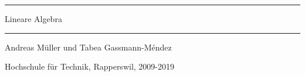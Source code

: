 \documentclass[a4paper,12pt]{book}
\begin{document}
\pagestyle{fancy}
\frontmatter
\newcommand\HRule{\noindent\rule{\linewidth}{1.5pt}}
\begin{titlepage}
\HRule
\vspace*{10pt}
\begin{flushright}
{\Huge
Lineare Algebra}
\end{flushright}
\HRule
\begin{flushright}
\vspace{30pt}
\LARGE
Andreas Müller
und
Tabea Gassmann-Méndez
\end{flushright}
\begin{center}
Hochschule für Technik, Rapperswil, 2009-2019
\end{center}
\end{titlepage}
\hypersetup{
    linktoc=all,
    linkcolor=blue
}
\tableofcontents
\newtheorem{satz}{Satz}[chapter]
\newtheorem{hilfssatz}[satz]{Hilfssatz}
\newtheorem{definition}[satz]{Definition}
\newtheorem{konvention}[satz]{Konvention}
\newtheorem{annahme}[satz]{Annahme}
\newtheorem{aufgabe}[satz]{Aufgabe}
\newenvironment{beispiel}[1][Beispiel]{%
\begin{proof}[\bf #1]%
\renewcommand{\qedsymbol}{$\bigcirc$}%
}{\end{proof}}
\mainmatter









%
%
%
%
%
%
%
%
%
%
%
%
%



\vfill
\pagebreak
\ifodd\value{page}\else\null\clearpage\fi

\appendix
\end{document}
